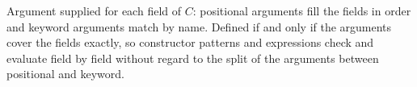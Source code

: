 Argument supplied for each field of $C$: positional arguments fill the fields in order and keyword
arguments match by name. Defined if and only if the arguments cover the fields exactly, so constructor
patterns and expressions check and evaluate field by field without regard to the split of the arguments
between positional and keyword.
